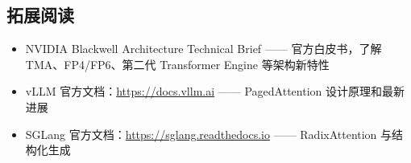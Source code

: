 \documentclass[a4paper]{article}
\begin{document}
\subsection{拓展阅读}

\begin{itemize}
\item NVIDIA Blackwell Architecture Technical Brief —— 官方白皮书，了解 TMA、FP4/FP6、第二代 Transformer Engine 等架构新特性
\item vLLM 官方文档：\href{https://docs.vllm.ai}{https://docs.vllm.ai} —— PagedAttention 设计原理和最新进展
\item SGLang 官方文档：\href{https://sglang.readthedocs.io}{https://sglang.readthedocs.io} —— RadixAttention 与结构化生成
\end{itemize}
\end{document}
